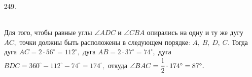 249. \begin{figure}[ht!]
\end{figure}\\
Для того, чтобы равные углы $\angle ADC$ и $\angle CBA$ опирались на одну и ту же дугу $AC,$ точки должны быть расположены в следующем порядке: $A,\ B,\ D,\ C.$ Тогда дуга $AC=2\cdot 56^\circ=112^\circ,$ дуга $AB=2\cdot37^\circ=74^\circ,$ дуга $BDC=360^\circ-112^\circ-74^\circ=174^\circ,$ откуда $\angle BAC=\cfrac{1}{2}\cdot 174^\circ=87^\circ.$\\
